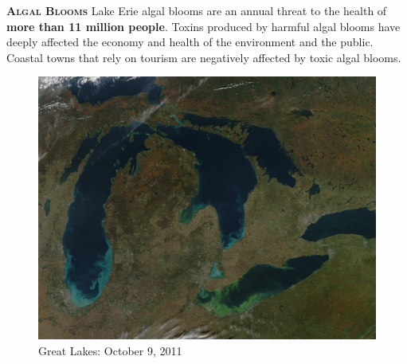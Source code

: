 \documentclass[final,t]{beamer}
\begin{document}
\begin{frame}{}

		\begin{columns}
            \begin{column}{.5\linewidth}
                \begin{block}{\textsc{\textbf{Algal Blooms}}}
                  \vspace*{3mm}
                       Lake Erie algal blooms are an annual threat to the health
                       of \textbf{more than 11 million people}. Toxins produced
                       by harmful algal blooms have deeply affected the economy
                       and health of the environment and the public. Coastal towns
                       that rely on tourism are negatively affected by toxic algal
                       blooms.
                  \begin{figure}
                    \centering
                        \includegraphics[scale = 0.15]{assets/algalbloom.jpg}
                        \caption{Great Lakes: October 9, 2011}
                  \end{figure}



\end{block}
\end{column}
\end{columns}
\end{frame}
\end{document}
